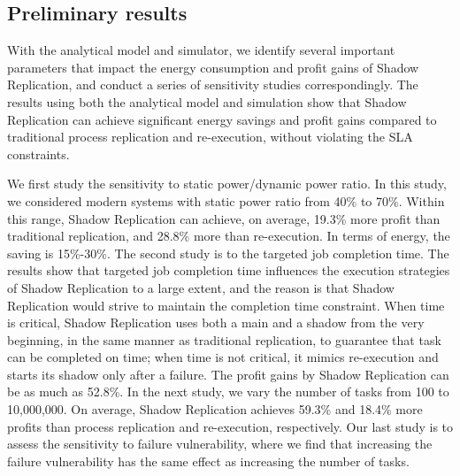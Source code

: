 \subsection{Preliminary results}
With the analytical model and simulator, we identify several important parameters that impact the energy consumption and profit gains of Shadow Replication, and conduct a series of sensitivity studies correspondingly. %
The results using both the analytical model and simulation show that Shadow Replication can achieve significant energy savings and profit gains compared to traditional process replication and re-execution, without violating the SLA constraints. %

We first study the sensitivity to static power/dynamic power ratio. In this study, we considered modern systems with static power ratio from 40\% to 70\%. Within this range, Shadow Replication can achieve, on average, 19.3\% more profit than traditional replication, and 28.8\% more than re-execution. In terms of energy, the saving is 15\%-30\%.
The second study is to the targeted job completion time. The results show that targeted job completion time influences the execution strategies of Shadow Replication to a large extent, and the reason is that Shadow Replication would strive to maintain the completion time constraint. When time is critical, Shadow Replication uses both a main and a shadow from the very beginning, in the same manner as traditional replication, to guarantee that task can be completed on time; when time is not critical, it mimics re-execution and starts its shadow only after a failure. The profit gains by Shadow Replication can be as much as 52.8\%.
In the next study, we vary the number of tasks from 100 to 10,000,000. On average, Shadow Replication achieves 59.3\% and 18.4\% more profits than process replication and re-execution, respectively.
Our last study is to assess the sensitivity to failure vulnerability, where we find that increasing the failure vulnerability has the same effect as increasing the number of tasks. 


